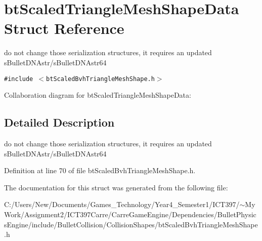 \hypertarget{structbt_scaled_triangle_mesh_shape_data}{
\section{btScaledTriangleMeshShapeData Struct Reference}
\label{structbt_scaled_triangle_mesh_shape_data}
}
do not change those serialization structures, it requires an updated sBulletDNAstr/sBulletDNAstr64  


{\tt \#include $<$btScaledBvhTriangleMeshShape.h$>$}

Collaboration diagram for btScaledTriangleMeshShapeData:

\subsection{Detailed Description}
do not change those serialization structures, it requires an updated sBulletDNAstr/sBulletDNAstr64 

Definition at line 70 of file btScaledBvhTriangleMeshShape.h.

The documentation for this struct was generated from the following file:\begin{CompactItemize}
\item 
C:/Users/New/Documents/Games\_\-Technology/Year4\_\-Semester1/ICT397/$\sim$My Work/Assignment2/ICT397Carre/CarreGameEngine/Dependencies/BulletPhysicsEngine/include/BulletCollision/CollisionShapes/btScaledBvhTriangleMeshShape.h\end{CompactItemize}

